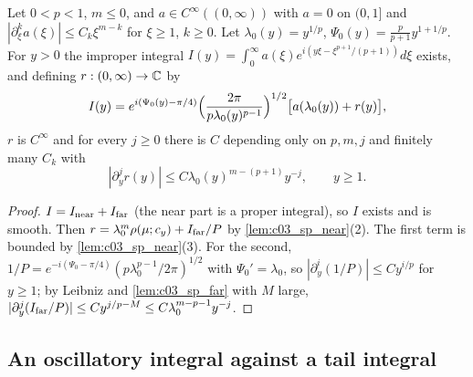 \begin{lemma}
  \label{lem:appendix_homogeneous_stationary_phase}
  Let $0<p<1$, $m\le0$, and $a\in C^\infty((0,\infty))$ with $a=0$ on $(0,1]$ and $|\partial_\xi^ka(\xi)|\le C_k\xi^{m-k}$ for $\xi\ge1$, $k\ge0$. Let $\lambda_0(y)=y^{1/p}$, $\Psi_0(y)=\frac p{p+1}y^{1+1/p}$. For $y>0$ the improper integral
  $I(y)=\int_0^\infty a(\xi)e^{i(y\xi-\xi^{p+1}/(p+1))}d\xi$ exists, and defining $r:(0,\infty)\to\mathbb{C}$ by
  \begin{equation}\label{eqn:appendix_homogeneous_stationary_expansion}
    I(y)=e^{i(\Psi_0(y)-\pi/4)}\Bigl(\frac{2\pi}{p\lambda_0(y)^{p-1}}\Bigr)^{1/2}\bigl[a(\lambda_0(y))+r(y)\bigr],
  \end{equation}
  $r$ is $C^\infty$ and for every $j\ge0$ there is $C$ depending only on $p,m,j$ and finitely many $C_k$ with
  \begin{equation}\label{eqn:appendix_homogeneous_stationary_remainder}
    |\partial_y^jr(y)|\le C\lambda_0(y)^{m-(p+1)}y^{-j},\qquad y\ge1 .
  \end{equation}
\end{lemma}
\begin{proof}
  $I=I_{\textup{near}}+I_{\textup{far}}$ (the near part is a proper integral), so $I$ exists and is smooth. Then $r=\lambda_0^m\rho(\mu;c_y)+I_{\textup{far}}/P$ by \cref{lem:c03_sp_near}(2).
  The first term is bounded by \cref{lem:c03_sp_near}(3). For the second, $1/P=e^{-i(\Psi_0-\pi/4)}(p\lambda_0^{p-1}/2\pi)^{1/2}$ with $\Psi_0'=\lambda_0$, so $|\partial_y^i(1/P)|\le Cy^{i/p}$ for $y\ge1$; by Leibniz and \cref{lem:c03_sp_far} with $M$ large, $|\partial_y^j(I_{\textup{far}}/P)|\le Cy^{j/p-M}\le C\lambda_0^{m-p-1}y^{-j}$.
\end{proof}

\subsection{An oscillatory integral against a tail integral}

